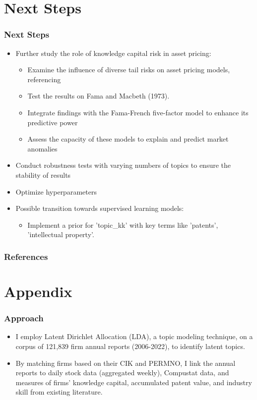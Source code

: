 \documentclass{beamer}
\begin{document}
\section{Next Steps}
\begin{frame}
\frametitle{Next Steps}
\begin{itemize}
    \item Further study the role of knowledge capital risk in asset pricing:
    \begin{itemize}
        \item Examine the influence of diverse tail risks on asset pricing models, referencing \cite{Kelly2014-oo}
        \item Test the results on Fama and Macbeth (1973).
        \item Integrate findings with the Fama-French five-factor model to enhance its predictive power
        \item Assess the capacity of these models to explain and predict market anomalies
    \end{itemize}
    \item Conduct robustness tests with varying numbers of topics to ensure the stability of results 
    \item Optimize hyperparameters
    \item Possible transition towards supervised learning models:
    \begin{itemize}
        \item Implement a prior for 'topic\_kk' with key terms like 'patents', 'intellectual property'.
    \end{itemize}
\end{itemize}
\end{frame}


\begin{frame}[allowframebreaks]
\frametitle{References}

\end{frame}

\section{Appendix}


\begin{frame}
\frametitle{Approach}
\label{slide:approach}
\begin{itemize}
\item I employ Latent Dirichlet Allocation (LDA), a topic modeling technique, on a corpus of 121,839 firm annual reports (2006-2022), to identify latent topics.
\item By matching firms based on their CIK and PERMNO, I link the annual reports to daily stock data (aggregated weekly), Compustat data, and measures of firms' knowledge capital, accumulated patent value, and industry skill from existing literature.
\end{itemize}
\end{frame}
\end{document}
